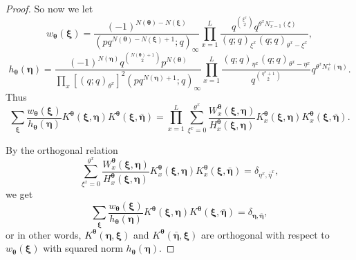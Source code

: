 \documentclass{ximera}
\begin{document}
\begin{proof}
So now we let 
\begin{equation*}
    w_{\boldsymbol\theta}(\boldsymbol\xi)=\frac{(-1)^{N(\boldsymbol\theta)-N(\boldsymbol\xi)}}{\left(pq^{N(\boldsymbol\theta)-N(\boldsymbol\xi)+1};q\right)_\infty }\prod_{x=1}^L\frac{q^{\binom{\xi^x}{2}}q^{\theta^x N_{x-1}^-(\xi)}}{(q;q)_{\xi^x}(q;q)_{\theta^x-\xi^x}},
\end{equation*}
\begin{equation*}
    h_{\boldsymbol\theta}(\boldsymbol\eta)=\frac{(-1)^{N(\boldsymbol\eta)}q^{\binom{N(\boldsymbol\theta)+1}{2}}p^{N(\boldsymbol\theta)}}{\prod_x[(q;q)_{\theta^x}]^{2} \left(pq^{N(\boldsymbol\eta)+1}; q\right)_\infty} \prod_{x=1}^L\frac{(q;q)_{\eta^x}(q;q)_{\theta^x-\eta^x}}{q^{\binom{\eta^x+1}{2}}}q^{\theta^x N_{x}^+(\boldsymbol\eta)}.
\end{equation*}
Thus
$$
  \sum_{\boldsymbol\xi} \frac{w_{\boldsymbol\theta}(\boldsymbol\xi)}{h_{\boldsymbol\theta}(\boldsymbol\eta)} K^{\boldsymbol\theta}(\boldsymbol\xi,\boldsymbol\eta) K^{\boldsymbol\theta}(\boldsymbol\xi,\boldsymbol{\bar{\eta}}) = \prod_{x=1}^L
 \sum_{\xi^x=0}^{\theta^x} \frac{W^{\boldsymbol\theta}_x(\boldsymbol\xi,\boldsymbol\eta)}{H^{\boldsymbol\theta}_x(\boldsymbol\xi,\boldsymbol\eta)}K^{\boldsymbol\theta}_x(\boldsymbol\xi,\boldsymbol\eta) K^{\boldsymbol\theta}_x(\boldsymbol\xi,\bar{\boldsymbol\eta}).
$$

By the orthogonal relation
\begin{equation*}
    \sum_{\xi^x=0}^{\theta^x} \frac{W^{\boldsymbol\theta}_x(\boldsymbol\xi,\boldsymbol\eta)}{H^{\boldsymbol\theta}_x(\boldsymbol\xi,\boldsymbol\eta)}K^{\boldsymbol\theta}_x(\boldsymbol\xi,\boldsymbol\eta) K^{\boldsymbol\theta}_x(\boldsymbol\xi,\bar{\boldsymbol\eta})=\delta_{\eta^x,\bar{\eta}^x},
\end{equation*}
we get
$$
\sum_{\boldsymbol\xi} \frac{w_{\boldsymbol\theta}(\boldsymbol\xi)}{h_{\boldsymbol\theta}(\boldsymbol\eta)} K^{\boldsymbol\theta}(\boldsymbol\xi,\boldsymbol\eta) K^{\boldsymbol\theta}(\boldsymbol{\boldsymbol\xi,\bar{\eta}}) = \delta_{\boldsymbol\eta,\bar{\boldsymbol\eta}},
$$
or in other words, $K^{\boldsymbol\theta}(\boldsymbol\eta,\boldsymbol\xi)$ and $K^{\boldsymbol\theta}(\boldsymbol{\bar{\eta}},\boldsymbol\xi)$ are orthogonal with respect to $w_{\boldsymbol\theta}(\boldsymbol\xi)$ with squared norm $h_{\boldsymbol\theta}(\boldsymbol\eta)$.  


\end{proof}
\end{document}
